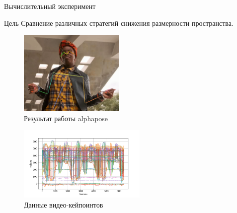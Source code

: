 \documentclass{beamer}
\begin{document}
	\begin{frame}{Вычислительный эксперимент}
		\begin{alertblock}{Цель}
			Сравнение различных стратегий снижения размерности пространства.
		\end{alertblock}
		
		
		\begin{multicols}{2}
		\begin{figure}
			\includegraphics[width=0.45\textwidth]{after_alphapose.png}
			\caption{Результат работы alphapose}
		\end{figure}
	
		\begin{figure}[bhtp]
			\includegraphics[width=0.55\textwidth]{cyclic_video_data.png}
			\caption{Данные видео-кейпоинтов}
		\end{figure}
		\end{multicols}
		
	\end{frame}
\end{document}
